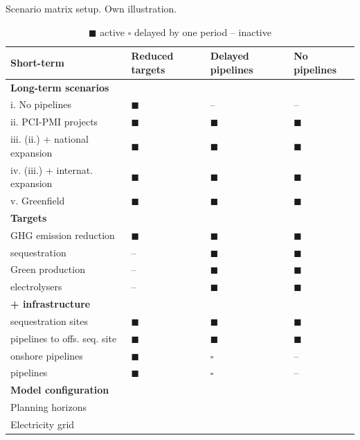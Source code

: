 \documentclass[preprint,12pt]{elsarticle}
\begin{document}
\begin{table}[htbp]
  \centering
  \caption{Scenario matrix setup. Own illustration.}
  \label{tab:scenarios}
  \scriptsize
  \begin{tabularx}{\textwidth}{R{4.1cm}>{\centering\arraybackslash}X>{\centering\arraybackslash}X>{\centering\arraybackslash}X}
    \toprule
    \textbf{Short-term} & \textbf{Reduced targets} & \textbf{Delayed pipelines} & \textbf{No pipelines} \\
    \midrule
    \textbf{Long-term scenarios} & & & \\
    i. No pipelines & $\blacksquare$ & -- & -- \\
    ii. PCI-PMI projects & $\blacksquare$ & $\blacksquare$ & $\blacksquare$ \\
    iii. (ii.) + national expansion & $\blacksquare$ & $\blacksquare$ & $\blacksquare$\\
    iv. (iii.) + internat. expansion & $\blacksquare$ & $\blacksquare$ & $\blacksquare$ \\
    v. Greenfield & $\blacksquare$ & $\blacksquare$ & $\blacksquare$ \\
    \midrule
    \textbf{Targets} & & & \\
    GHG emission reduction &  $\blacksquare$ &  $\blacksquare$ &  $\blacksquare$ \\
     sequestration &  -- &  $\blacksquare$ &  $\blacksquare$ \\
    Green  production &  -- &  $\blacksquare$ &  $\blacksquare$ \\
     electrolysers &  -- &  $\blacksquare$ &  $\blacksquare$ \\
    \midrule
    \textbf{ +  infrastructure} & & & \\
     sequestration sites & $\blacksquare$ &  $\blacksquare$ &  $\blacksquare$ \\
     pipelines to offs. seq. site & $\blacksquare$ &  $\blacksquare$ &  $\blacksquare$ \\
     onshore pipelines & $\blacksquare$ &  $\square$ &  -- \\
     pipelines & $\blacksquare$ &  $\square$ &  -- \\
    \midrule
    \textbf{Model configuration} & & & \\
    Planning horizons &   \\
    Electricity grid &  \\

    \bottomrule
  \end{tabularx}
  \caption*{\scriptsize $\blacksquare$ active \quad $\square$ delayed by one period \quad -- inactive}
\end{table}
\end{document}
